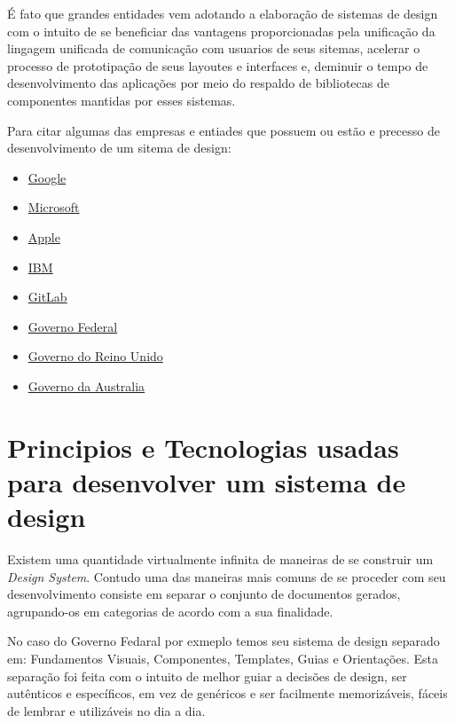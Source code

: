   É fato que grandes entidades vem adotando a elaboração de sistemas de design com o intuito de se beneficiar das vantagens proporcionadas pela unificação da lingagem unificada de comunicação com usuarios de seus sitemas, acelerar o processo de prototipação de seus layoutes e interfaces e, deminuir o tempo de desenvolvimento das aplicações por meio do respaldo de bibliotecas de componentes mantidas por esses sistemas.

  Para citar algumas das empresas e entiades que possuem ou estão e precesso de desenvolvimento de um sitema de design:

\begin{itemize}
  \item \href{https://material.io/design/}{Google}
  \item \href{https://www.microsoft.com/design/fluent/#/}{Microsoft}
  \item \href{https://developer.apple.com/design/}{Apple}
  \item \href{https://www.carbondesignsystem.com/}{IBM}
  \item \href{https://www.figma.com/community/plugin/860845891704482356/GitLab}{GitLab}
  \item \href{https://www.gov.br/governodigital/pt-br/transformacao-digital/ferramentas/design-system}{Governo Federal}
  \item \href{https://www.gov.uk/guidance/government-design-principles}{Governo do Reino Unido }
  \item \href{https://designsystem.gov.au/}{Governo da Australia}
\end{itemize}

\section{Principios e Tecnologias usadas para desenvolver um sistema de design}

  Existem uma quantidade virtualmente infinita de maneiras de se construir um \textit{Design System}. Contudo uma das maneiras mais comuns de se proceder com seu desenvolvimento consiste em separar o conjunto de documentos gerados, agrupando-os em categorias de acordo com a sua finalidade.

  No caso do Governo Fedaral por exmeplo temos seu sistema de design separado em: Fundamentos Visuais, Componentes, Templates, Guias e Orientações. Esta separação foi feita com o intuito de melhor guiar a decisões de design, ser autênticos e específicos, em vez de genéricos e ser facilmente memorizáveis, fáceis de lembrar e utilizáveis no dia a dia. \cite{design_gov_federal}

